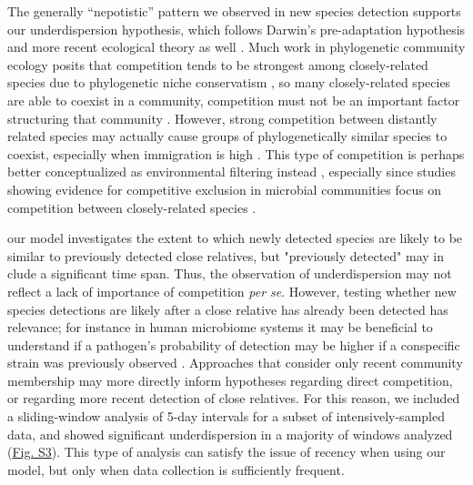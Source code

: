 \documentclass{article}
\begin{document}
\par
The generally “nepotistic” pattern we observed in new species detection supports our underdispersion hypothesis, which follows Darwin's pre-adaptation hypothesis \cite{Darwin1859} and more recent ecological theory as well \cite{DAndrea2019,Mayfield2010}. Much work in phylogenetic community ecology posits that competition tends to be strongest among closely-related species due to phylogenetic niche conservatism \cite{Wiens2010}, so many closely-related species are able to coexist in a community, competition must not be an important factor structuring that community \cite{Webb2002}. However, strong competition between distantly related species may actually cause groups of phylogenetically similar species to coexist, especially when immigration is high \cite{DAndrea2019,Mayfield2010,Scheffer6230}. This type of competition is perhaps better conceptualized as environmental filtering instead \cite{Mayfield2010}, especially since studies showing evidence for competitive exclusion in microbial communities focus on competition between closely-related species \cite{Peay2012,Sprockett2018}. 
\par
our model investigates the extent to which newly detected species are likely to be similar to previously detected close relatives, but "previously detected" may in clude a significant time span. Thus, the observation of underdispersion may not reflect a lack of importance of competition \emph{per se}. However, testing whether new species detections are likely after a close relative has already been detected has relevance; for instance in human microbiome systems it may be beneficial to understand if a pathogen's probability of detection may be higher if a conspecific strain was previously observed \cite{Li2016,Stecher2010}. Approaches that consider only recent community membership may more directly inform hypotheses regarding direct competition, or regarding more recent detection of close relatives. For this reason, we included a sliding-window analysis of 5-day intervals for a subset of intensively-sampled data, and showed significant underdispersion in a majority of windows analyzed (\hyperref[sec:figureS3]{Fig. S3}). This type of analysis can satisfy the issue of recency when using our model, but only when data collection is sufficiently frequent.
\par
\end{document}
